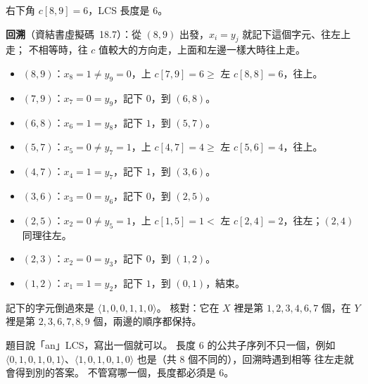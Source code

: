 \begin{pastsoln}
右下角 $c[8, 9] = 6$，LCS 長度是 $6$。

\textbf{回溯}（資結書虛擬碼~18.7）：從 $(8, 9)$ 出發，$x_i = y_j$ 就記下這個字元、往左上走；
不相等時，往 $c$ 值較大的方向走，上面和左邊一樣大時往上走。
\begin{itemize}
\item $(8,9)$：$x_8 = 1 \ne y_9 = 0$，上 $c[7,9] = 6 \ge$ 左 $c[8,8] = 6$，往上。
\item $(7,9)$：$x_7 = 0 = y_9$，記下 $0$，到 $(6,8)$。
\item $(6,8)$：$x_6 = 1 = y_8$，記下 $1$，到 $(5,7)$。
\item $(5,7)$：$x_5 = 0 \ne y_7 = 1$，上 $c[4,7] = 4 \ge$ 左 $c[5,6] = 4$，往上。
\item $(4,7)$：$x_4 = 1 = y_7$，記下 $1$，到 $(3,6)$。
\item $(3,6)$：$x_3 = 0 = y_6$，記下 $0$，到 $(2,5)$。
\item $(2,5)$：$x_2 = 0 \ne y_5 = 1$，上 $c[1,5] = 1 <$ 左 $c[2,4] = 2$，往左；$(2,4)$ 同理往左。
\item $(2,3)$：$x_2 = 0 = y_3$，記下 $0$，到 $(1,2)$。
\item $(1,2)$：$x_1 = 1 = y_2$，記下 $1$，到 $(0,1)$，結束。
\end{itemize}
記下的字元倒過來是 $\langle 1, 0, 0, 1, 1, 0\rangle$。 核對：它在 $X$ 裡是第 $1, 2, 3, 4, 6, 7$
個，在 $Y$ 裡是第 $2, 3, 6, 7, 8, 9$ 個，兩邊的順序都保持。

題目說「an」LCS，寫出一個就可以。 長度 $6$ 的公共子序列不只一個，例如
$\langle 0,1,0,1,0,1\rangle$、$\langle 1,0,1,0,1,0\rangle$ 也是（共 $8$ 個不同的），回溯時遇到相等
往左走就會得到別的答案。 不管寫哪一個，長度都必須是 $6$。
\end{pastsoln}
